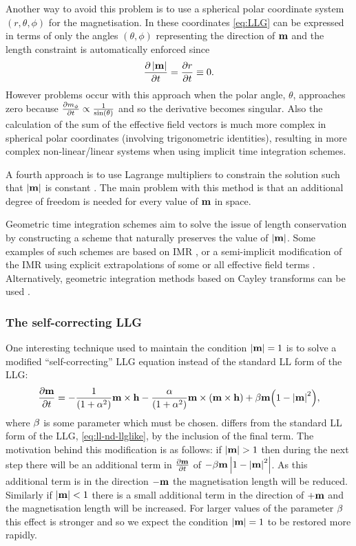 Another way to avoid this problem is to use a spherical polar coordinate system $(r,\theta,\phi)$ for the magnetisation.
In these coordinates \cref{eq:LLG} can be expressed in terms of only the angles $(\theta,\phi)$ representing the direction of $\boldsymbol{\mathrm{m}}$ and the length constraint is automatically enforced since
\begin{equation}
  \label{eq:40}
  \frac{\partial \left|{\boldsymbol{\mathrm{m}}} \right|}{\partial t} = \frac{\partial r}{\partial t} \equiv 0.
\end{equation}
However problems occur with this approach when the polar angle, $\theta$, approaches zero because $\frac{\partial m_{\phi}}{\partial t} \propto \frac{1}{\sin(\theta)}$ \cite{Fukushima2005} and so the derivative becomes singular.
Also the calculation of the sum of the effective field vectors is much more complex in spherical polar coordinates (involving trigonometric identities), resulting in more complex non-linear/linear systems when using implicit time integration schemes.

A fourth approach is to use Lagrange multipliers to constrain the solution such that $\left|{\boldsymbol{\mathrm{m}}} \right|$ is constant \cite{Szambolics2008a}.
The main problem with this method is that an additional degree of freedom is needed for every value of $\boldsymbol{\mathrm{m}}$ in space.

Geometric time integration schemes aim to solve the issue of length conservation by constructing a scheme that naturally preserves the value of $\left|{\boldsymbol{\mathrm{m}}} \right|$.
Some examples of such schemes are based on IMR \cite{DAquino2005}, or a semi-implicit modification of the IMR using explicit extrapolations of some or all effective field terms \cite{Spargo2003,Serpico2001,Mentink2010,Bottauscio2008}.
Alternatively, geometric integration methods based on Cayley transforms can be used \cite{Lewis2003,Bottauscio2011}.

\subsubsection{The self-correcting LLG}
\label{sec:sc-llg}

One interesting technique used to maintain the condition $\left|{\boldsymbol{\mathrm{m}}} \right| = 1$ is to solve a modified ``self-correcting'' LLG equation \cite{Porter2005} \cite{Fischbacher2009} instead of the standard LL form of the LLG:
\begin{equation}
  \label{eq:sc-ll}
  \frac{\partial \boldsymbol{\mathrm{m}}}{\partial t} = -\frac{1}{(1 + \alpha^2)}\boldsymbol{\mathrm{m}} \times \boldsymbol{\mathrm{h}}  -\frac{\alpha}{(1 + \alpha^2)} \boldsymbol{\mathrm{m}} \times {\left( \boldsymbol{\mathrm{m}}\times \boldsymbol{\mathrm{h}}\right)}
  + \beta \boldsymbol{\mathrm{m}} {\left( 1 - \left|{\boldsymbol{\mathrm{m}}} \right|^2 \right)},
\end{equation}
where $\beta$ is some parameter which must be chosen.
 differs from the standard LL form of the LLG, \cref{eq:ll-nd-llglike}, by the inclusion of the final term.
The motivation behind this modification is as follows: if $\left|{\boldsymbol{\mathrm{m}}} \right| > 1$ then during the next step there will be an additional term in $\frac{\partial \boldsymbol{\mathrm{m}}}{\partial t}$ of $-\beta \boldsymbol{\mathrm{m}} \left|{1 - \left|{\boldsymbol{\mathrm{m}}} \right|^2} \right|$.
As this additional term is in the direction $-\boldsymbol{\mathrm{m}}$ the magnetisation length will be reduced.
Similarly if $\left|{\boldsymbol{\mathrm{m}}} \right| < 1$ there is a small additional term in the direction of $+\boldsymbol{\mathrm{m}}$ and the magnetisation length will be increased.
For larger values of the parameter $\beta$ this effect is stronger and so we expect the condition $\left|{\boldsymbol{\mathrm{m}}} \right| = 1$ to be restored more rapidly.

